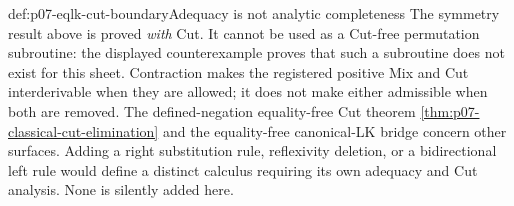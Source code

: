 \begin{hbwarning}{def:p07-eqlk-cut-boundary}{Adequacy is not analytic completeness}
The symmetry result above is proved \emph{with} Cut. It cannot be used
as a Cut-free permutation subroutine: the displayed counterexample proves
that such a subroutine does not exist for this sheet. Contraction makes
the registered positive Mix and Cut interderivable when they are allowed;
it does not make either admissible when both are removed.
The defined-negation equality-free Cut theorem
\cref{thm:p07-classical-cut-elimination} and the equality-free
canonical-LK bridge concern other surfaces. Adding a right substitution
rule, reflexivity deletion, or a bidirectional left rule would define a
distinct calculus requiring its own adequacy and Cut analysis. None is
silently added here.
\end{hbwarning}

